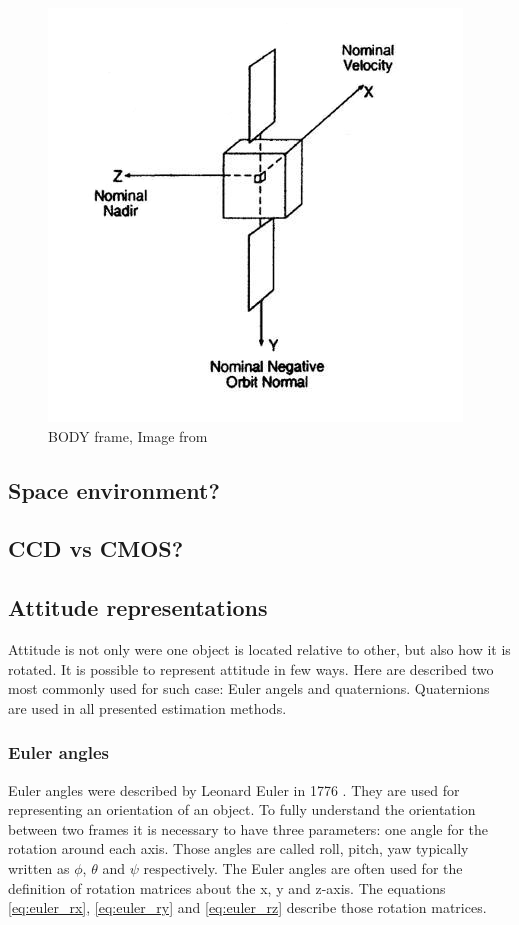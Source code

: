 \documentclass[12pt,a4paper,oneside]{article}
\begin{document}
\begin{figure}[!htb]
\includegraphics[scale=0.5]{body_frame.jpg}
\centering
\caption{BODY frame, Image from \citet{larson1992space}}
\label{fig:body_frame}
\end{figure}

\subsection{Space environment?}

\subsection{CCD vs CMOS?}

\subsection{Attitude representations}
Attitude is not only were one object is located relative to other, but also how it is rotated. It is possible to represent attitude in few ways. Here are described two most commonly used for such case: Euler angels and quaternions. Quaternions are used in all presented estimation methods.

\subsubsection{Euler angles}

Euler angles were described by Leonard Euler in 1776 \cite{euler1775formulae}. They are used for representing an orientation of an object.
To fully understand the orientation between two frames it is necessary to have three parameters: one angle for the rotation around each axis. Those angles are called roll, pitch, yaw typically written as $\phi$, $\theta$ and $\psi$ respectively. The Euler angles are often used for the definition of rotation matrices about the x, y and z-axis. The equations \ref{eq:euler_rx}, \ref{eq:euler_ry} and \ref{eq:euler_rz} describe those rotation matrices.
\end{document}
